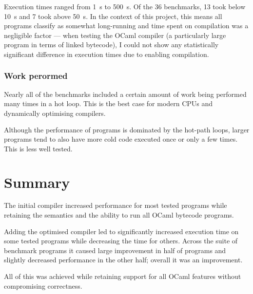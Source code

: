 Execution times ranged from \SI{1}{\second} to \SI{500}{\second}. Of the 36 benchmarks, 13 took
below \SI{10}{\second} and 7 took above \SI{50}{\second}.  In the context of this project, this
means all programs classify as somewhat long-running and time spent on compilation was a negligible
factor --- when testing the OCaml compiler (a particularly large program in terms of linked
bytecode), I could not show any statistically significant difference in execution times due to
enabling compilation.

\subsubsection{Work perormed}

Nearly all of the benchmarks included a certain amount of work being performed many times in a hot
loop. This is the best case for modern CPUs and dynamically optimising compilers.

Although the performance of programs is dominated by the hot-path loops, larger programs tend to
also have more cold code executed once or only a few times. This is less well tested.

\section{Summary}

The initial compiler increased performance for most tested programs while retaining the semantics
and the ability to run all OCaml bytecode programs.

Adding the optimised compiler led to significantly increased execution time on some tested programs
while decreasing the time for others. Across the suite of benchmark programs it caused large
improvement in half of programs and slightly decreased performance in the other half; overall it
was an improvement.

All of this was achieved while retaining support for all OCaml features without compromising
correctness.